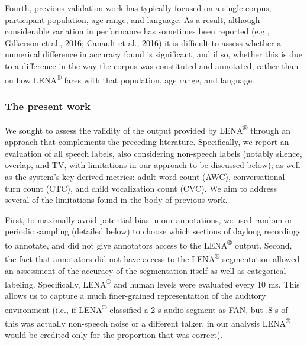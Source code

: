 \documentclass[english,table,man,floatsintext]{apa6}
\begin{document}
Fourth, previous validation work has typically focused on a single corpus, participant population, age range, and language. As a result, although considerable variation in performance has sometimes been reported (e.g., Gilkerson et al., 2016; Canault et al., 2016) it is difficult to assess whether a numerical difference in accuracy found is significant, and if so, whether this is due to a difference in the way the corpus was constituted and annotated, rather than on how LENA\textsuperscript{®} fares with that population, age range, and language.

\hypertarget{the-present-work}{%
\subsubsection{The present work}\label{the-present-work}}

We sought to assess the validity of the output provided by LENA\textsuperscript{®} through an approach that complements the preceding literature. Specifically, we report an evaluation of all speech labels, also considering non-speech labels (notably silence, overlap, and TV, with limitations in our approach to be discussed below); as well as the system's key derived metrics: adult word count (AWC), conversational turn count (CTC), and child vocalization count (CVC). We aim to address several of the limitations found in the body of previous work.

First, to maximally avoid potential bias in our annotations, we used random or periodic sampling (detailed below) to choose which sections of daylong recordings to annotate, and did not give annotators access to the LENA\textsuperscript{®} output. Second, the fact that annotators did not have access to the LENA\textsuperscript{®} segmentation allowed an assessment of the accuracy of the segmentation itself as well as categorical labeling. Specifically, LENA\textsuperscript{®} and human levels were evaluated every 10 ms. This allows us to capture a much finer-grained representation of the auditory environment (i.e., if LENA\textsuperscript{®} classified a 2 s audio segment as FAN, but .8 s of this was actually non-speech noise or a different talker, in our analysis LENA\textsuperscript{®} would be credited only for the proportion that was correct).
\end{document}
